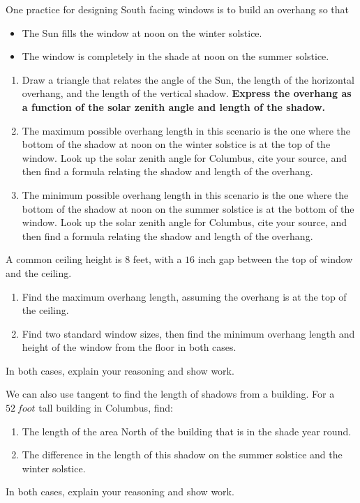 \documentclass[noauthor,nooutcomes,handout,hints,12pt]{ximera}
\begin{document}
\mynewpage


\begin{question}
 One practice for designing South facing windows is to build an
 overhang so that
 \begin{itemize}
 \item The Sun fills the window at noon on the winter solstice.
 \item The window is completely in the shade at noon on the summer
   solstice.
 \end{itemize}
\begin{enumerate}
\item Draw a triangle that relates the angle of the Sun, the length of
  the horizontal overhang, and the length of the vertical shadow.
  \textbf{Express the overhang as a function of the solar zenith angle and length of the shadow.}
\item The maximum possible overhang length in this scenario is the one
  where the bottom of the shadow at noon on the winter solstice is at
  the top of the window. Look up the solar zenith angle for Columbus,
  cite your source, and then find a formula relating the shadow and
  length of the overhang. 
\item The minimum possible overhang length in this scenario is the one
  where the bottom of the shadow at noon on the summer solstice is at
  the bottom of the window. Look up the solar zenith angle for Columbus, cite
  your source, and then find a formula relating the shadow and length
  of the overhang. 
\end{enumerate}
\end{question}
\mynewpage


\begin{question}
 A common ceiling height is $8$ feet, with a $16$ inch gap between the
 top of window and the ceiling.
 
\begin{enumerate}
 \item Find the maximum overhang length, assuming the overhang is at
   the top of the ceiling.
 \item Find two standard window sizes, then find the minimum overhang
   length and height of the window from the floor in both cases.
\end{enumerate}
In both cases, explain your reasoning and show work.
\end{question}
\mynewpage

\begin{question}
 We can also use tangent to find the length of shadows from a
 building. For a $52\ foot$ tall building in Columbus, find:
 
\begin{enumerate}
 \item The length of the area North of the building that is in the
   shade year round.
 \item The difference in the length of this shadow on the summer
   solstice and the winter solstice.
\end{enumerate}
In both cases, explain your reasoning and show work.
\end{question}
\end{document}
